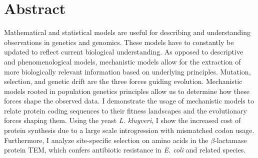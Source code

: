\chapter*{Abstract}\label{ch:abstract}

Mathematical and statistical models are useful for describing and understanding observations in genetics and genomics.
These models have to constantly be updated to reflect current biological understanding.
As opposed to descriptive and phenomenological models, mechanistic models allow for the extraction of more biologically relevant information based on underlying principles.
Mutation, selection, and genetic drift are the three forces guiding evolution.
Mechanistic models rooted in population genetics principles allow us to determine how these forces shape the observed data.
I demonstrate the usage of mechanistic models to relate protein coding sequences to their fitness landscapes and the evolutionary forces shaping them.
Using the yeast \textit{L. kluyveri}, I show the increased cost of protein synthesis due to a large scale introgression with mismatched codon usage.
Furthermore, I analyze site-specific selection on amino acids in the $\beta$-lactamase protein TEM, which confers antibiotic resistance in \textit{E. coli} and related species. 


